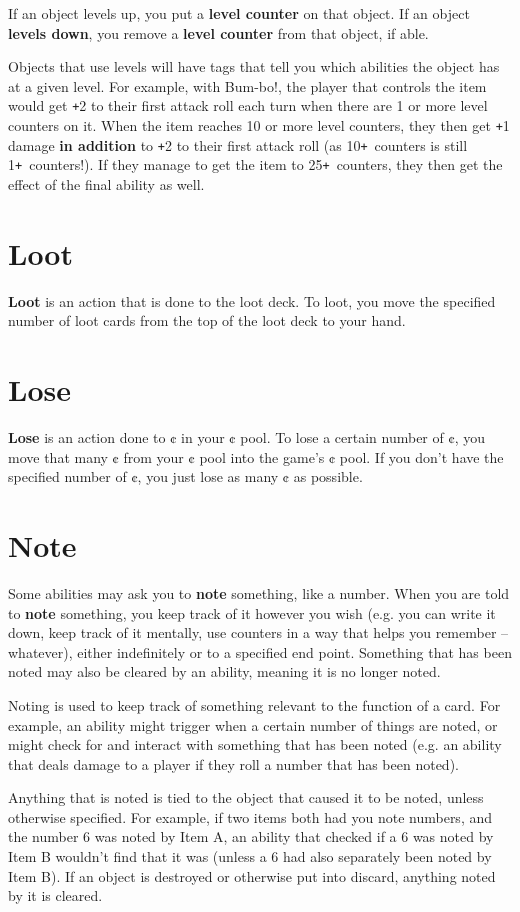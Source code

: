 \documentclass[
  fontsize=10pt,
  paper=a5,
  version=last,
  chapterprefix=true,
  bindingoffset=5mm,
  ]{scrbook}
\def\plus{\texttt{+}}
\begin{document}
    If an object levels up, you put a \textbf{level counter} on that object. If an object \textbf{levels down}, you remove a \textbf{level counter} from that object, if able.

    Objects that use levels will have tags that tell you which abilities the object has at a given level. For example, with Bum-bo!, the player that controls the item would get \plus2 to their first attack roll each turn when there are 1 or more level counters on it. When the item reaches 10 or more level counters, they then get \plus1 damage \textbf{in addition} to \plus2 to their first attack roll (as 10\plus\ counters is still 1\plus\ counters!). If they manage to get the item to 25\plus\ counters, they then get the effect of the final ability as well.
    \section{Loot}
    \textbf{Loot} is an action that is done to the loot deck. To loot, you move the specified number of loot cards from the top of the loot deck to your hand.
    \section{Lose}
    \textbf{Lose} is an action done to ¢ in your ¢ pool. To lose a certain number of ¢, you move that many ¢ from your ¢ pool into the game’s ¢ pool. If you don’t have the specified number of ¢, you just lose as many ¢ as possible.
    \section{Note}
    Some abilities may ask you to \textbf{note} something, like a number. When you are told to \textbf{note} something, you keep track of it however you wish (e.g. you can write it down, keep track of it mentally, use counters in a way that helps you remember – whatever), either indefinitely or to a specified end point. Something that has been noted may also be cleared by an ability, meaning it is no longer noted.

    Noting is used to keep track of something relevant to the function of a card. For example, an ability might trigger when a certain number of things are noted, or might check for and interact with something that has been noted (e.g. an ability that deals damage to a player if they roll a number that has been noted).

    Anything that is noted is tied to the object that caused it to be noted, unless otherwise specified. For example, if two items both had you note numbers, and the number 6 was noted by Item A, an ability that checked if a 6 was noted by Item B wouldn’t find that it was (unless a 6 had also separately been noted by Item B). If an object is destroyed or otherwise put into discard, anything noted by it is cleared.
\end{document}
